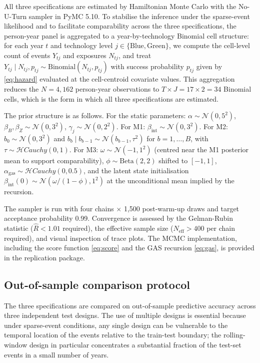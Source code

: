 \documentclass[12pt,a4paper]{article}
\newcommand{\bint}{\beta_{\text{int}}}
\theoremstyle{plain}
\theoremstyle{definition}
\begin{document}
All three specifications are estimated by Hamiltonian Monte Carlo with the No-U-Turn sampler in PyMC 5.10. To stabilise the inference under the sparse-event likelihood and to facilitate comparability across the three specifications, the person-year panel is aggregated to a year-by-technology Binomial cell structure: for each year $t$ and technology level $j \in \{\text{Blue}, \text{Green}\}$, we compute the cell-level count of events $Y_{tj}$ and exposures $N_{tj}$, and treat $Y_{tj} \mid N_{tj}, p_{tj} \sim \text{Binomial}(N_{tj}, p_{tj})$ with success probability $p_{tj}$ given by \eqref{eq:hazard} evaluated at the cell-centroid covariate values. This aggregation reduces the $N = 4{,}162$ person-year observations to $T \times J = 17 \times 2 = 34$ Binomial cells, which is the form in which all three specifications are estimated.

The prior structure is as follows. For the static parameters: $\alpha \sim \mathcal{N}(0, 5^2)$, $\beta_B, \beta_Z \sim \mathcal{N}(0, 3^2)$, $\gamma_j \sim \mathcal{N}(0, 2^2)$. For M1: $\bint \sim \mathcal{N}(0, 3^2)$. For M2: $b_0 \sim \mathcal{N}(0, 3^2)$ and $b_b \mid b_{b-1} \sim \mathcal{N}(b_{b-1}, \tau^2)$ for $b = 1, \ldots, B$, with $\tau \sim \mathcal{H}\!\mathit{Cauchy}(0, 1)$. For M3: $\omega \sim \mathcal{N}(-1, 1^2)$ (centred near the M1 posterior mean to support comparability), $\phi \sim \text{Beta}(2, 2)$ shifted to $[-1, 1]$, $\alpha_{\mathrm{gas}} \sim \mathcal{H}\!\mathit{Cauchy}(0, 0.5)$, and the latent state initialisation $\bint(0) \sim \mathcal{N}(\omega / (1 - \phi), 1^2)$ at the unconditional mean implied by the recursion.

The sampler is run with four chains $\times$ 1{,}500 post-warm-up draws and target acceptance probability 0.99. Convergence is assessed by the Gelman-Rubin statistic ($\hat{R} < 1.01$ required), the effective sample size ($N_{\mathrm{eff}} > 400$ per chain required), and visual inspection of trace plots. The MCMC implementation, including the score function \eqref{eq:score} and the GAS recursion \eqref{eq:gas}, is provided in the replication package.

\subsection{Out-of-sample comparison protocol}
\label{sec:meth-oos}

The three specifications are compared on out-of-sample predictive accuracy across three independent test designs. The use of multiple designs is essential because under sparse-event conditions, any single design can be vulnerable to the temporal location of the events relative to the train-test boundary; the rolling-window design in particular concentrates a substantial fraction of the test-set events in a small number of years.
\end{document}
